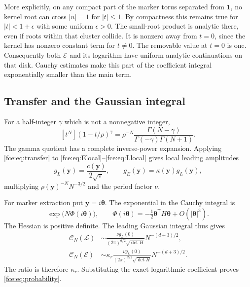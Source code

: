 \documentclass[11pt,a4paper]{article}
\numberwithin{equation}{section}
\theoremstyle{definition}\newtheorem{definition}[theorem]{Definition}
\theoremstyle{remark}\newtheorem{remark}[theorem]{Remark}
\newcommand{\E}{\mathcal E}
\newcommand{\Lcal}{\mathcal L}
\newcommand{\one}{\boldsymbol 1}
\begin{document}
More explicitly, on any compact part of the marker torus separated from
$\one$, no kernel root can cross $|u|=1$ for $|t|\le1$. By compactness
this remains true for $|t|<1+\epsilon$ with some uniform $\epsilon>0$.
The small-root product is analytic there, even if roots within that
cluster collide. It is nonzero away from $t=0$, since the kernel has
nonzero constant term for $t\ne0$. The removable value at $t=0$ is one.
Consequently both $\E$ and its logarithm have uniform analytic
continuations on that disk. Cauchy estimates make this part of the
coefficient integral exponentially smaller than the main term.

\subsection{Transfer and the Gaussian integral}
For a half-integer $\gamma$ which is not a nonnegative integer,
\begin{equation}\label{fce:eq:transfer}
 [t^N](1-t/\rho)^\gamma
 =\rho^{-N}\frac{\Gamma(N-\gamma)}{\Gamma(-\gamma)\Gamma(N+1)}.
\end{equation}
The gamma quotient has a complete inverse-power expansion. Applying
\eqref{fce:eq:transfer} to \eqref{fce:eq:Elocal}--\eqref{fce:eq:Llocal} gives local
leading amplitudes
\begin{equation}\label{fce:eq:amplitudes}
 g_L(\boldsymbol y)=\frac{c(\boldsymbol y)}{2\sqrt\pi},\qquad
 g_E(\boldsymbol y)=\kappa(\boldsymbol y)g_L(\boldsymbol y),
\end{equation}
multiplying $\rho(\boldsymbol y)^{-N}N^{-3/2}$ and the period factor $\nu$.

For marker extraction put $\boldsymbol y=i\boldsymbol\theta$. The
exponential in the Cauchy integral is
\[
 \exp\bigl(N\Phi(i\boldsymbol\theta)\bigr),\qquad
 \Phi(i\boldsymbol\theta)=-\tfrac12\boldsymbol\theta^{\mathsf T}
 H\boldsymbol\theta+O(|\boldsymbol\theta|^3).
\]
The Hessian is positive definite. The leading Gaussian integral thus gives
\begin{align}
 \mathcal C_N(\Lcal)
 &\sim\frac{\nu g_L(0)}{(2\pi)^{d/2}\sqrt{\det H}}
                   N^{-(d+3)/2},\label{fce:eq:Lcoefficient}\\
 \mathcal C_N(\E)
 &\sim\kappa_r\frac{\nu g_L(0)}{(2\pi)^{d/2}\sqrt{\det H}}
                   N^{-(d+3)/2}.
 \label{fce:eq:Ecoefficient}
\end{align}
The ratio is therefore $\kappa_r$. Substituting the exact logarithmic
coefficient proves \eqref{fce:eq:probability}.
\end{document}
